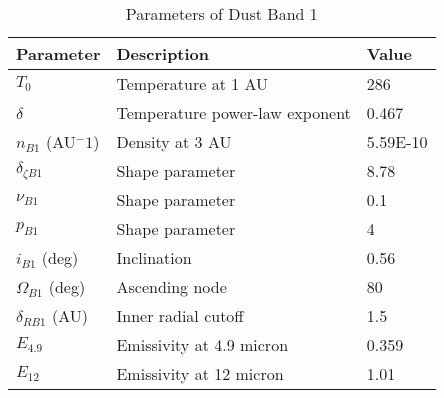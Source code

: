 \documentclass[a4paper,10pt]{article}
\begin{document}
\begin{table}[htbp]
\caption{Parameters of Dust Band 1}
\begin{tabular}{lll}
\hline
\textbf{Parameter} & \textbf{Description}           & \textbf{Value} \\ \hline
$T_0$                 & Temperature at 1 AU            & 286            \\
$\delta$              & Temperature power-law exponent & 0.467          \\
$n_{B1}$ (AU$^-1$)         & Density at 3 AU                & 5.59E-10       \\
$\delta_{\zeta B1}$      & Shape parameter                & 8.78           \\
$\nu_{B1}$              & Shape parameter                & 0.1            \\
$p_{B1}$               & Shape parameter                & 4              \\
$i_{B1}$ (deg)         & Inclination                    & 0.56           \\
$\Omega_{B1}$ (deg)     & Ascending node                 & 80             \\
$\delta_{RB1}$ (AU)    & Inner radial cutoff            & 1.5            \\
$E_{4.9}$               & Emissivity at 4.9 micron       & 0.359          \\
$E_{12}$                & Emissivity at 12 micron        & 1.01           \\ \hline
\end{tabular}
\end{table}
\end{document}

